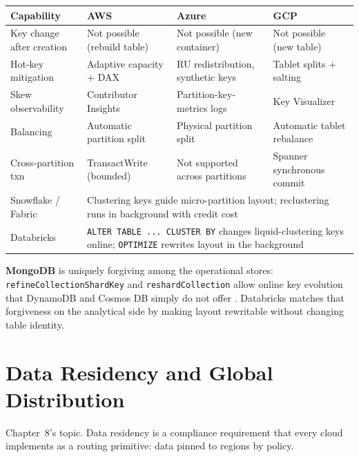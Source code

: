 \begin{center}
\footnotesize
\begin{tabular}{@{}p{2.9cm}p{3.0cm}p{3.0cm}p{3.0cm}@{}}
\toprule
\textbf{Capability} & \textbf{AWS} & \textbf{Azure} & \textbf{GCP} \\
\midrule
Key change after creation & Not possible (rebuild table) & Not possible (new container) & Not possible (new table) \\
Hot-key mitigation & Adaptive capacity + DAX & RU redistribution, synthetic keys & Tablet splits + salting \\
Skew observability & Contributor Insights & Partition-key-metrics logs & Key Visualizer \\
Balancing & Automatic partition split & Physical partition split & Automatic tablet rebalance \\
Cross-partition txn & TransactWrite (bounded) & Not supported across partitions & Spanner synchronous commit \\
\addlinespace
Snowflake / Fabric & \multicolumn{3}{l}{Clustering keys guide micro-partition layout; reclustering runs in background with credit cost} \\
Databricks & \multicolumn{3}{l}{\texttt{ALTER TABLE ... CLUSTER BY} changes liquid-clustering keys online; \texttt{OPTIMIZE} rewrites layout in the background} \\
\bottomrule
\end{tabular}
\end{center}

\noindent \textbf{MongoDB} is uniquely forgiving among the operational stores:
\texttt{refineCollectionShardKey} and \texttt{reshardCollection} allow online key evolution that
DynamoDB and Cosmos DB simply do not offer \cite{mongodbShardKeyDocs}. Databricks matches that
forgiveness on the analytical side by making layout rewritable without changing table identity.

\section{Data Residency and Global Distribution}
%
Chapter~8's topic. Data residency is a compliance requirement that every cloud implements as a
routing primitive: data pinned to regions by policy.

